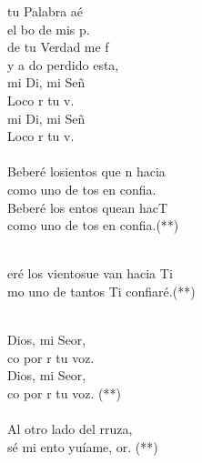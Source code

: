 \begin{cancion}[Hacia Ti][Ixcís]%
	tu Palabra aé\\
	el bo de mis p.\\
	de tu Verdad me f\\
	y a do perdido esta,\\
	mi Di, mi Señ\\
	Loco  r tu v. \\
	mi Di, mi Señ\\
	Loco  r tu v.\\
\jump\\
	Beberé losientos que n hacia\\
	como uno de tos en  confia.\\
	Beberé los entos quean hacT\\
	como uno de tos en  confia.(**)\\\jump\\
	\begin{chorus}%
	eré los vientosue van hacia Ti\\
	mo uno de tantos Ti confiaré.(**)\\
	\end{chorus}%
	\jump\\
	Dios, mi Seor,\\
	co por r tu voz.\\
	Dios, mi Seor,\\
	co por r tu voz. (**)\\
\jump\\
	Al otro lado del rruza,\\
	sé mi ento yuíame, or. (**) \\\jump\\
	\begin{chorus}%

\end{chorus}
\end{cancion}
